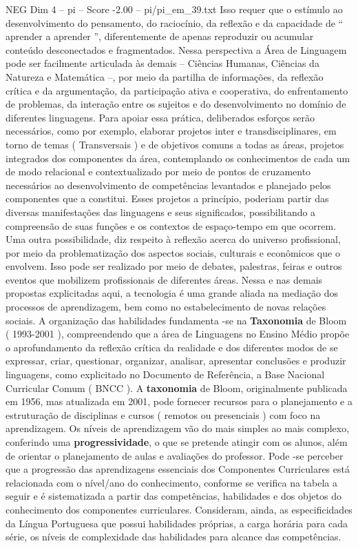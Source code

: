 \begin{textsample}{NEG Dim 4 – pi – Score -2.00 – pi/pi\_em\_39.txt}
Isso requer que o estímulo ao desenvolvimento do pensamento, do raciocínio, da reflexão e da capacidade de “ aprender a aprender ”, diferentemente de apenas reproduzir ou acumular conteúdo desconectados e fragmentados.
Nessa perspectiva a Área de Linguagem pode ser facilmente articulada às demais – Ciências Humanas, Ciências da Natureza e Matemática –, por meio da partilha de informações, da reflexão crítica e da argumentação, da participação ativa e cooperativa, do enfrentamento de problemas, da interação entre os sujeitos e do desenvolvimento no domínio de diferentes linguagens.
Para apoiar essa prática, deliberados esforços serão necessários, como por exemplo, elaborar projetos inter e transdisciplinares, em torno de temas ( Transversais ) e de objetivos comuns a todas as áreas, projetos integrados dos componentes da área, contemplando os conhecimentos de cada um de modo relacional e contextualizado por meio de pontos de cruzamento necessários ao desenvolvimento de competências levantados e planejado pelos componentes que a constitui.
Esses projetos a princípio, poderiam partir das diversas manifestações das linguagens e seus significados, possibilitando a compreensão de suas funções e os contextos de espaço-tempo em que ocorrem.
Uma outra possibilidade, diz respeito à reflexão acerca do universo profissional, por meio da problematização dos aspectos sociais, culturais e econômicos que o envolvem.
Isso pode ser realizado por meio de debates, palestras, feiras e outros eventos que mobilizem profissionais de diferentes áreas.
Nessa e nas demais propostas explicitadas aqui, a tecnologia é uma grande aliada na mediação dos processos de aprendizagem, bem como no estabelecimento de novas relações sociais.
A organização das habilidades fundamenta -se na \textbf{Taxonomia} de Bloom ( 1993-2001 ), compreendendo que a área de Linguagens no Ensino Médio propõe o aprofundamento da reflexão crítica da realidade e dos diferentes modos de se expressar, criar, questionar, organizar, analisar, apresentar conclusões e produzir linguagens, como explicitado no Documento de Referência, a Base Nacional Curricular Comum ( BNCC ).
A \textbf{taxonomia} de Bloom, originalmente publicada em 1956, mas atualizada em 2001, pode fornecer recursos para o planejamento e a estruturação de disciplinas e cursos ( remotos ou presenciais ) com foco na aprendizagem.
Os níveis de aprendizagem vão do mais simples ao mais complexo, conferindo uma \textbf{progressividade}, o que se pretende atingir com os alunos, além de orientar o planejamento de aulas e avaliações do professor.
Pode -se perceber que a progressão das aprendizagens essenciais dos Componentes Curriculares está relacionada com o nível/ano do conhecimento, conforme se verifica na tabela a seguir e é sistematizada a partir das competências, habilidades e dos objetos do conhecimento dos componentes curriculares.
Consideram, ainda, as especificidades da Língua Portuguesa que possui habilidades próprias, a carga horária para cada série, os níveis de complexidade das habilidades para alcance das competências.

\end{textsample}
